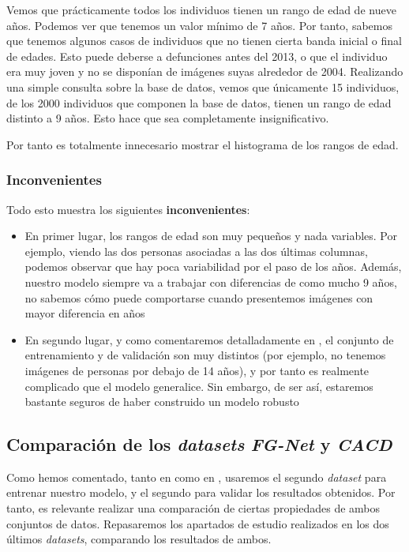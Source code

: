 Vemos que prácticamente todos los individuos tienen un rango de edad de nueve años. Podemos ver que tenemos un valor mínimo de 7 años. Por tanto, sabemos que tenemos algunos casos de individuos que no tienen cierta banda inicial o final de edades. Esto puede deberse a defunciones antes del 2013, o que el individuo era muy joven y no se disponían de imágenes suyas alrededor de 2004. Realizando una simple consulta sobre la base de datos, vemos que únicamente 15 individuos, de los 2000 individuos que componen la base de datos, tienen un rango de edad distinto a 9 años. Esto hace que sea completamente insignificativo.

Por tanto es totalmente innecesario mostrar el histograma de los rangos de edad.

\subsubsection{Inconvenientes}

Todo esto muestra los siguientes \textbf{inconvenientes}:

\begin{itemize}
    \item En primer lugar, los rangos de edad son muy pequeños y nada variables. Por ejemplo, viendo  las dos personas asociadas a las dos últimas columnas, podemos observar que hay poca variabilidad por el paso de los años. Además, nuestro modelo siempre va a trabajar con diferencias de como mucho 9 años, no sabemos cómo puede comportarse cuando presentemos imágenes con mayor diferencia en años
    \item En segundo lugar, y como comentaremos detalladamente en \label{isec:comparaciones_datasets}, el conjunto de entrenamiento y de validación son muy distintos (por ejemplo, no tenemos imágenes de personas por debajo de 14 años), y por tanto es realmente complicado que el modelo generalice. Sin embargo, de ser así, estaremos bastante seguros de haber construido un modelo robusto
\end{itemize}

\subsection{Comparación de los \textit{datasets} \textit{FG-Net} y \textit{CACD}} \label{isec:comparaciones_datasets}

Como hemos comentado, tanto en  como en , usaremos el segundo \textit{dataset} para entrenar nuestro modelo, y el segundo para validar los resultados obtenidos. Por tanto, es relevante realizar una comparación de ciertas propiedades de ambos conjuntos de datos. Repasaremos los apartados de estudio realizados en los dos últimos \textit{datasets}, comparando los resultados de ambos.


